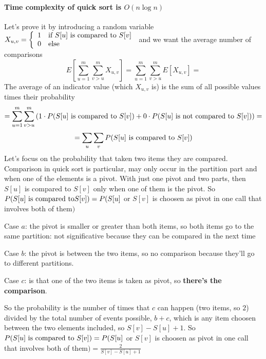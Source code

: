 \documentclass[10pt]{report}
\begin{document}
\paragraph{Time complexity of quick sort is $O(n\log n)$} Let's prove it by introducing a random variable\\ $X_{u,v} = \left\{\begin{array}{c l}
1&\hbox{if }S[u]\hbox{ is compared to }S[v]\\0&\hbox{else}
\end{array}\right.$ and we want the average number of comparisons $$E\left[\sum_{u=1}^m\sum_{v>u}^m X_{u,v}\right] = \sum_{u=1}^m\sum_{v>u}^m E\left[X_{u,v}\right] = $$
The average of an indicator value (which $X_{u,v}$ is) is the sum of all possible values times their probability $$= \sum_{u=1}^m\sum_{v>u}^m \left(1\cdot P(S[u]\hbox{ is compared to }S[v]) + 0\cdot P(S[u]\hbox{ is not compared to }S[v])\right) = $$
$$=\sum_u \sum_v P(S[u]\hbox{ is compared to }S[v])$$
Let's focus on the probability that taken two items they are compared. Comparison in quick sort is particular, may only occur in the partition part and when one of the elements is a pivot. With just one pivot and two parts, then $S[u]$ is compared to $S[v]$ only when one of them is the pivot. So $P(S[u]\hbox{ is compared to}S[v]) = P(S[u]$ or $S[v]$ is choosen as pivot in one call that involves both of them$)$
\begin{list}{}{}
	\item Case $a$: the pivot is smaller or greater than both items, so both items go to the same partition: not significative because they can be compared in the next time 
	\item Case $b$: the pivot is between the two items, so no comparison because they'll go to different partitions.
	\item Case $c$: is that one of the two items is taken as pivot, so \textbf{there's the comparison}.
\end{list}
So the probability is the number of times that $c$ can happen (two items, so $2$) divided by the total number of events possible, $b + c$, which is any item choosen between the two elements included, so $S[v] - S[u] + 1$. So $P(S[u]\hbox{ is compared to }S[v]) = P(S[u]$ or $S[v]$ is choosen as pivot in one call that involves both of them$) = \frac{2}{S[v] - S[u] + 1}$\\
\end{document}
